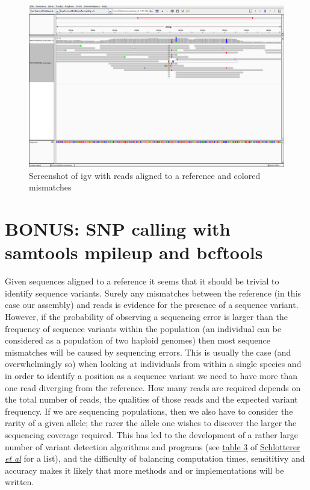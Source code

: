 \documentclass[11pt]{article}
\begin{document}
\begin{figure}[htb]
\centering
\includegraphics[width=17cm]{igv.png}
\caption{\label{fig:igv}Screenshot of igv with reads aligned to a reference and colored mismatches}
\end{figure}

\clearpage
\section{BONUS: SNP calling with samtools mpileup and bcftools}
\label{sec-4}
Given sequences aligned to a reference it seems that it should be trivial to
identify sequence variants. Surely any mismatches between the reference (in this case our assembly)
and reads is evidence for the
presence of a sequence variant. However, if the probability of observing a
sequencing error is larger than the frequency of sequence variants within the
population (an individual can be considered as a population of
two haploid genomes) then most sequence mismatches will be caused by
sequencing errors. This is usually the case (and overwhelmingly so) when looking at individuals from
within a single species and in order to identify a position as a sequence
variant we need to have more than one read diverging from the reference. How
many reads are required depends on the total number of reads, the qualities
of those reads and the expected variant frequency. If we are sequencing
populations, then we also have to consider the rarity of a given allele;
the rarer the allele one wishes to discover the larger the sequencing coverage
required. This has led to the
development of a rather large number of variant detection algorithms and
programs (see
\href{http://www.nature.com/nrg/journal/v15/n11/fig_tab/nrg3803_T3.html}{table 3} of \href{http://www.nature.com/nrg/journal/v15/n11/full/nrg3803.html}{Schlotterer \emph{et al}} for a list), and the difficulty of balancing
computation times, sensititivy and accuracy makes it likely that more methods
and or implementations will be written.
\end{document}
